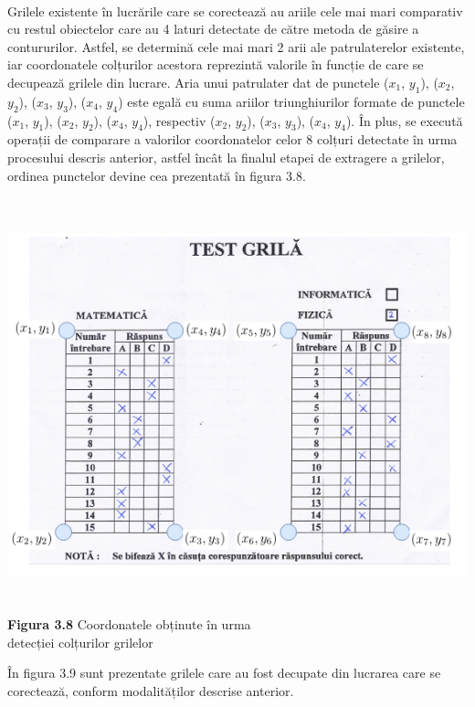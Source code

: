 \documentclass[a4paper,12pt]{report}
\newcommand\tab[1][1cm]{\hspace*{#1}}
\begin{document}
\\ \tab Grilele existente în lucrările care se corectează au ariile cele mai mari comparativ cu restul obiectelor care au 4 laturi detectate de către metoda de găsire a contururilor. Astfel, se determină cele mai mari 2 arii ale patrulaterelor existente, iar coordonatele colțurilor acestora reprezintă valorile în funcție de care se decupează grilele din lucrare. Aria unui patrulater dat de punctele  ($x_{1}$,  $y_{1}$), ($x_{2}$,  $y_{2}$), ($x_{3}$,  $y_{3}$), ($x_{4}$,  $y_{4}$) este egală cu suma ariilor triunghiurilor formate de punctele ($x_{1}$,  $y_{1}$), ($x_{2}$,  $y_{2}$), ($x_{4}$,  $y_{4}$), respectiv  ($x_{2}$,  $y_{2}$), ($x_{3}$,  $y_{3}$), ($x_{4}$,  $y_{4}$). În plus, se execută operații de comparare a valorilor coordonatelor celor 8 colțuri detectate în urma procesului descris anterior, astfel încât la finalul etapei de extragere a grilelor, ordinea punctelor devine cea prezentată în figura 3.8.
\begin {center} 
	\begin {footnotesize} 
		\includegraphics[height = 120mm, width =155mm]{fig3_8} \\
		\textbf  {Figura 3.8} Coordonatele obținute în urma \\ detecției colțurilor grilelor
	\end {footnotesize} 
\end {center}
\tab În figura 3.9 sunt prezentate grilele care au fost decupate din lucrarea care se corectează, conform modalităților descrise anterior.
\end{document}
